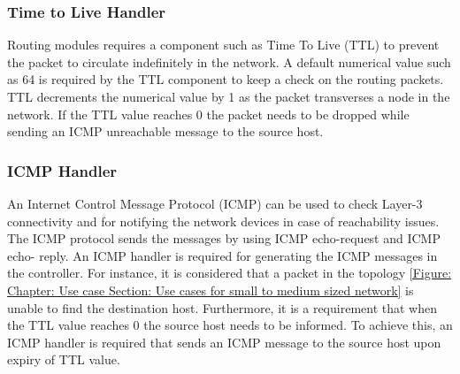 \subsubsection{Time to Live Handler}
\label{Chapter: Use cases and Requirements:Section: Routing Requirements: Subsection: Time To Live}

Routing modules requires a component such as Time To Live (TTL) to prevent the packet to circulate indefinitely in the network. A default numerical value such as 64 is required by the TTL component to keep a check on the routing packets. TTL decrements the numerical value by 1 as the packet transverses a node in the network. If the TTL value reaches 0 the packet needs to be dropped while sending an ICMP unreachable message to the source host.
\subsubsection{ICMP Handler}
\label{Chapter: Use cases and Requirements:Section: Routing Requirements: Subsection: ICMP Handler}
An Internet Control Message Protocol (ICMP) can be used to check Layer-3 connectivity and for notifying the network devices in case of reachability issues. The ICMP protocol sends the messages by using ICMP echo-request and ICMP echo- reply. An ICMP handler is required for generating the ICMP messages in the controller. For instance, it is considered that a packet in the topology \ref{Figure: Chapter: Use case Section: Use cases for small to medium sized network} is unable to find the destination host. Furthermore, it is a requirement that when the TTL value reaches 0 the source host needs to be informed. To achieve this, an ICMP handler is required that sends an ICMP message to the source host upon expiry of TTL value.


